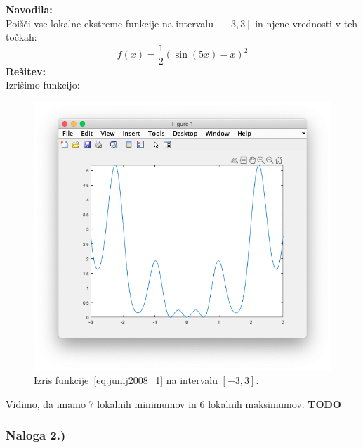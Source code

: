 \documentclass[a4paper,11pt]{article}
\begin{document}
\textbf{Navodila:} \\
Poišči vse lokalne ekstreme funkcije na intervalu $[-3, 3]$ in njene vrednosti v teh točkah:
\begin{equation} \label{eq:junij2008_1}
f(x) = \frac{1}{2}( \sin(5x) - x)^2
\end{equation}
\textbf{Rešitev:} \\
Izrišimo funkcijo:

\begin{figure}[hbt]
\centering
\includegraphics[scale=.4]{images/junij2008_1_plot.png}
\caption{Izris funkcije~\ref{eq:junij2008_1} na intervalu $[-3, 3]$.}
\label{img:junij2008_1_plot}
\end{figure}
Vidimo, da imamo 7 lokalnih minimumov in 6 lokalnih maksimumov. \textbf{TODO}


\subsubsection{Naloga 2.)}
\label{task:junij2008_2}
\end{document}
